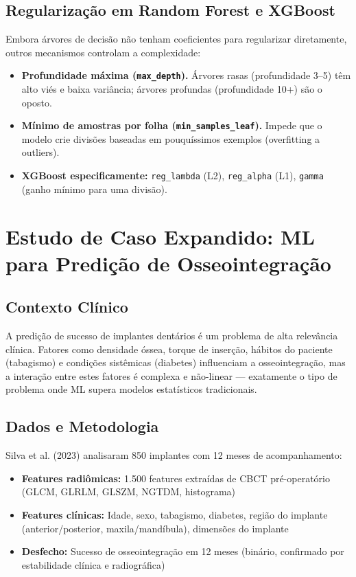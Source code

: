 \subsection{Regularização em Random Forest e XGBoost}

Embora árvores de decisão não tenham coeficientes para regularizar diretamente, outros mecanismos controlam a complexidade:

\begin{itemize}
    \item \textbf{Profundidade máxima (\texttt{max\_depth}).} Árvores rasas (profundidade 3--5) têm alto viés e baixa variância; árvores profundas (profundidade 10+) são o oposto.
    \item \textbf{Mínimo de amostras por folha (\texttt{min\_samples\_leaf}).} Impede que o modelo crie divisões baseadas em pouquíssimos exemplos (overfitting a outliers).
    \item \textbf{XGBoost especificamente:} \texttt{reg\_lambda} (L2), \texttt{reg\_alpha} (L1), \texttt{gamma} (ganho mínimo para uma divisão).
\end{itemize}

\section{Estudo de Caso Expandido: ML para Predição de Osseointegração}

\subsection{Contexto Clínico}

A predição de sucesso de implantes dentários é um problema de alta relevância clínica. Fatores como densidade óssea, torque de inserção, hábitos do paciente (tabagismo) e condições sistêmicas (diabetes) influenciam a osseointegração, mas a interação entre estes fatores é complexa e não-linear — exatamente o tipo de problema onde ML supera modelos estatísticos tradicionais.

\subsection{Dados e Metodologia}

Silva et al. (2023) \cite{ODT-056} analisaram 850 implantes com 12 meses de acompanhamento:

\begin{itemize}
    \item \textbf{Features radiômicas:} 1.500 features extraídas de CBCT pré-operatório (GLCM, GLRLM, GLSZM, NGTDM, histograma)
    \item \textbf{Features clínicas:} Idade, sexo, tabagismo, diabetes, região do implante (anterior/posterior, maxila/mandíbula), dimensões do implante
    \item \textbf{Desfecho:} Sucesso de osseointegração em 12 meses (binário, confirmado por estabilidade clínica e radiográfica)
\end{itemize}

